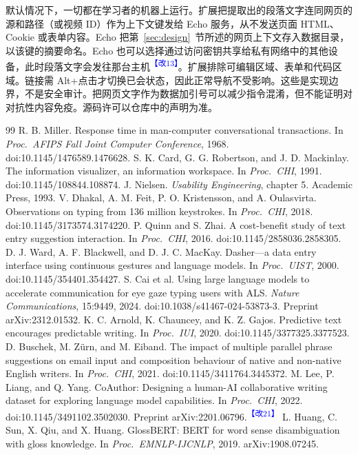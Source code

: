 \documentclass[11pt,a4paper,fontset=windows]{ctexart}
\newcommand{\audit}[1]{\textcolor{blue}{\textsuperscript{【改#1】}}}
\begin{document}
默认情况下，一切都在学习者的机器上运行。扩展把提取出的段落文字连同网页的源和路径（或视频 ID）作为上下文键发给 Echo 服务，从不发送页面 HTML、Cookie 或表单内容。Echo 把第~\ref{sec:design}~节所述的网页上下文存入数据目录，以该键的摘要命名。Echo 也可以选择通过访问密钥共享给私有网络中的其他设备，此时段落文字会发往那台主机\audit{13}。扩展排除可编辑区域、表单和代码区域。链接需 Alt+点击才切换已会状态，因此正常导航不受影响。这些是实现边界，不是安全审计。把网页文字作为数据加引号可以减少指令混淆，但不能证明对对抗性内容免疫。源码许可以仓库中的声明为准。

\begingroup
\footnotesize
\begin{thebibliography}{99}
\setlength{\itemsep}{2pt}
 R. B. Miller. Response time in man-computer conversational transactions. In \emph{Proc.\ AFIPS Fall Joint Computer Conference}, 1968. doi:10.1145/1476589.1476628.
 S. K. Card, G. G. Robertson, and J. D. Mackinlay. The information visualizer, an information workspace. In \emph{Proc.\ CHI}, 1991. doi:10.1145/108844.108874.
 J. Nielsen. \emph{Usability Engineering}, chapter 5. Academic Press, 1993.
 V. Dhakal, A. M. Feit, P. O. Kristensson, and A. Oulasvirta. Observations on typing from 136 million keystrokes. In \emph{Proc.\ CHI}, 2018. doi:10.1145/3173574.3174220.
 P. Quinn and S. Zhai. A cost-benefit study of text entry suggestion interaction. In \emph{Proc.\ CHI}, 2016. doi:10.1145/2858036.2858305.
 D. J. Ward, A. F. Blackwell, and D. J. C. MacKay. Dasher---a data entry interface using continuous gestures and language models. In \emph{Proc.\ UIST}, 2000. doi:10.1145/354401.354427.
 S. Cai et al. Using large language models to accelerate communication for eye gaze typing users with ALS. \emph{Nature Communications}, 15:9449, 2024. doi:10.1038/s41467-024-53873-3. Preprint arXiv:2312.01532.
 K. C. Arnold, K. Chauncey, and K. Z. Gajos. Predictive text encourages predictable writing. In \emph{Proc.\ IUI}, 2020. doi:10.1145/3377325.3377523.
 D. Buschek, M. Z\"urn, and M. Eiband. The impact of multiple parallel phrase suggestions on email input and composition behaviour of native and non-native English writers. In \emph{Proc.\ CHI}, 2021. doi:10.1145/3411764.3445372.
 M. Lee, P. Liang, and Q. Yang. CoAuthor: Designing a human-AI collaborative writing dataset for exploring language model capabilities. In \emph{Proc.\ CHI}, 2022. doi:10.1145/3491102.3502030. Preprint arXiv:2201.06796.\audit{21}
 L. Huang, C. Sun, X. Qiu, and X. Huang. GlossBERT: BERT for word sense disambiguation with gloss knowledge. In \emph{Proc.\ EMNLP-IJCNLP}, 2019. arXiv:1908.07245.

\end{thebibliography}
\end{document}
